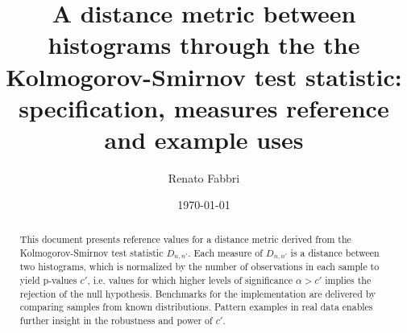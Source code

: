 \documentclass[%
	aip,
	jmp,%
	amsmath,amssymb,
	reprint,%
]{revtex4-1}
\begin{document}

\title[Distances between histograms]{A distance metric between histograms
through the the Kolmogorov-Smirnov test statistic: specification, measures reference and example uses}%
\author{Renato Fabbri}%

\date{\today}%

\begin{abstract}
This document presents reference values for a distance metric
derived from the Kolmogorov-Smirnov test statistic $D_{n,n'}$.
Each measure of $D_{n,n'}$ is a distance between two histograms,
which is normalized by the number of observations in each sample
to yield p-values $c'$, i.e. values for which 
higher levels of significance $\alpha>c'$ implies the rejection of the null hypothesis.
Benchmarks for the implementation are delivered by comparing samples from known distributions.
Pattern examples in real data enables further
insight in the robustness and power of $c'$.
\end{abstract}

\maketitle
\end{document}
